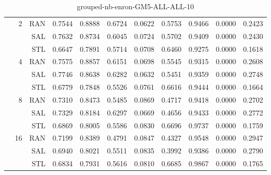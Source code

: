 \begin{center}
\begin{table}[htbp]
\begin{tabular}{ | r | r | r | r | r | r | r | r | r | r | r |}
 & \multirow{3}{*}{2} & RAN & 0.7544 & 0.8888 & 0.6724 & 0.0622 & 0.5753 & 0.9466 & 0.0000 & 0.2423\\ \cline{3-11}
 &   & SAL & 0.7632 & 0.8734 & 0.6045 & 0.0724 & 0.5702 & 0.9409 & 0.0000 & 0.2430\\ \cline{3-11}
 &   & STL & 0.6647 & 0.7891 & 0.5714 & 0.0708 & 0.6460 & 0.9275 & 0.0000 & 0.1618\\ \cline{2-11}
 & \multirow{3}{*}{4} & RAN & 0.7575 & 0.8857 & 0.6151 & 0.0698 & 0.5545 & 0.9315 & 0.0000 & 0.2608\\ \cline{3-11}
 &   & SAL & 0.7746 & 0.8638 & 0.6282 & 0.0632 & 0.5451 & 0.9359 & 0.0000 & 0.2748\\ \cline{3-11}
 &   & STL & 0.6779 & 0.7848 & 0.5526 & 0.0761 & 0.6616 & 0.9444 & 0.0000 & 0.1664\\ \cline{2-11}
 & \multirow{3}{*}{8} & RAN & 0.7310 & 0.8473 & 0.5485 & 0.0869 & 0.4717 & 0.9418 & 0.0000 & 0.2702\\ \cline{3-11}
 &   & SAL & 0.7329 & 0.8184 & 0.6297 & 0.0669 & 0.4656 & 0.9433 & 0.0000 & 0.2772\\ \cline{3-11}
 &   & STL & 0.6869 & 0.8005 & 0.5586 & 0.0830 & 0.6696 & 0.9737 & 0.0000 & 0.1759\\ \cline{2-11}
 & \multirow{3}{*}{16} & RAN & 0.7199 & 0.8389 & 0.4791 & 0.0847 & 0.4327 & 0.9548 & 0.0000 & 0.2947\\ \cline{3-11}
 &   & SAL & 0.6940 & 0.8021 & 0.5511 & 0.0835 & 0.3992 & 0.9386 & 0.0000 & 0.2790\\ \cline{3-11}
 &   & STL & 0.6834 & 0.7931 & 0.5616 & 0.0810 & 0.6685 & 0.9867 & 0.0000 & 0.1765\\ \cline{2-11}
\hline
\end{tabular}
\caption{grouped-nb-enron-GM5-ALL-ALL-10}
\end{table}
\end{center}

